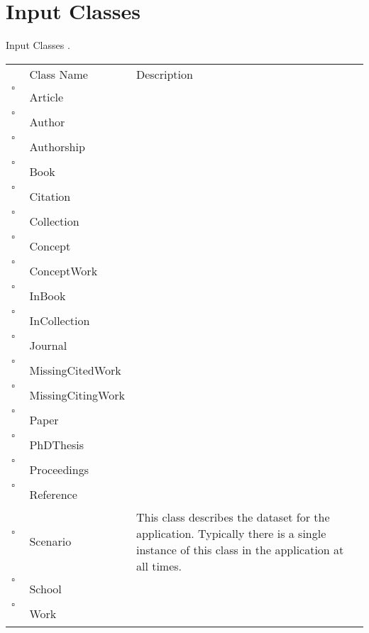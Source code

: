\chapter{Input Classes}
Input Classes     .
\begin{longtable}{llp{8cm}}
& Class Name & Description \\
$\square$\ & Article &  \\
$\square$\ & Author &  \\
$\square$\ & Authorship &  \\
$\square$\ & Book &  \\
$\square$\ & Citation &  \\
$\square$\ & Collection &  \\
$\square$\ & Concept &  \\
$\square$\ & ConceptWork &  \\
$\square$\ & InBook &  \\
$\square$\ & InCollection &  \\
$\square$\ & Journal &  \\
$\square$\ & MissingCitedWork &  \\
$\square$\ & MissingCitingWork &  \\
$\square$\ & Paper &  \\
$\square$\ & PhDThesis &  \\
$\square$\ & Proceedings &  \\
$\square$\ & Reference &  \\
$\square$\ & Scenario & This class describes the dataset for the application. Typically there is a single instance of this class in the application at all times. \\
$\square$\ & School &  \\
$\square$\ & Work &  \\
\end{longtable}
